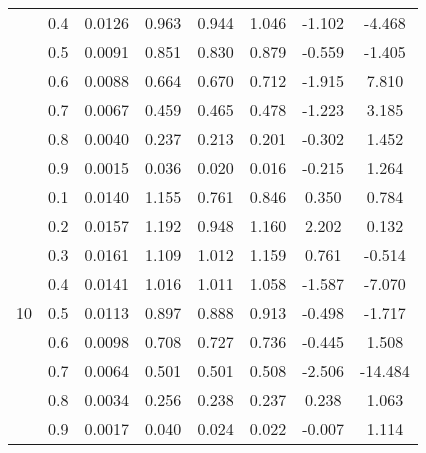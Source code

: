 \documentclass[11pt,a4paper]{report}
\begin{document}
\begin{longtable}{ | c | c || c | c | c | c | c | c | }
 & 0.4 & 0.0126 & 0.963 & 0.944 & 1.046 & -1.102 & -4.468 \\
 & 0.5 & 0.0091 & 0.851 & 0.830 & 0.879 & -0.559 & -1.405 \\
 & 0.6 & 0.0088 & 0.664 & 0.670 & 0.712 & -1.915 & 7.810 \\
 & 0.7 & 0.0067 & 0.459 & 0.465 & 0.478 & -1.223 & 3.185 \\
 & 0.8 & 0.0040 & 0.237 & 0.213 & 0.201 & -0.302 & 1.452 \\
 & 0.9 & 0.0015 & 0.036 & 0.020 & 0.016 & -0.215 & 1.264 \\
 \hline
\multirow{9}{*}{10} & 0.1 & 0.0140 & 1.155 & 0.761 & 0.846 & 0.350 & 0.784 \\
 & 0.2 & 0.0157 & 1.192 & 0.948 & 1.160 & 2.202 & 0.132 \\
 & 0.3 & 0.0161 & 1.109 & 1.012 & 1.159 & 0.761 & -0.514 \\
 & 0.4 & 0.0141 & 1.016 & 1.011 & 1.058 & -1.587 & -7.070 \\
 & 0.5 & 0.0113 & 0.897 & 0.888 & 0.913 & -0.498 & -1.717 \\
 & 0.6 & 0.0098 & 0.708 & 0.727 & 0.736 & -0.445 & 1.508 \\
 & 0.7 & 0.0064 & 0.501 & 0.501 & 0.508 & -2.506 & -14.484 \\
 & 0.8 & 0.0034 & 0.256 & 0.238 & 0.237 & 0.238 & 1.063 \\
 & 0.9 & 0.0017 & 0.040 & 0.024 & 0.022 & -0.007 & 1.114 \\
 \hline
\hline
\end{longtable}
\end{document}
